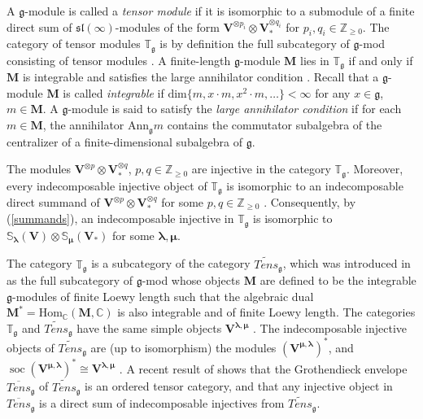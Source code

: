 \documentclass[12pt,oneside,english]{amsart}
\numberwithin{equation}{section}
\numberwithin{figure}{section}
\theoremstyle{plain}
\theoremstyle{plain}
\theoremstyle{remark}
\theoremstyle{definition}
\theoremstyle{plain}
\theoremstyle{remark}
\theoremstyle{definition}
\theoremstyle{plain}
\theoremstyle{plain}
\theoremstyle{definition}
\newcommand{\bV}{\mathbf{V}}
\newcommand{\bM}{\mathbf{M}}
\newcommand{\soc}{\operatorname{soc}}
\newcommand{\fg}{\mathfrak{g}}
\begin{document}
A $\fg$-module is called a {\em tensor module} if it is isomorphic to a submodule of a finite direct sum of $\mathfrak{sl}(\infty)$-modules of the form $\bV^{\otimes p_i}\otimes \bV_{*}^{\otimes q_i}$ for $p_i,q_i \in\mathbb{Z}_{\geq 0}$.
The category of tensor modules  $\mathbb{T}_{\mathfrak{g}}$  is by definition the full subcategory of $\mathfrak{g}$-mod consisting of tensor modules \cite{DPS}.
A finite-length $\mathfrak{g}$-module $\bM$ lies in  $\mathbb{T}_{\mathfrak{g}}$ if and only if $\bM$ is integrable and satisfies the large annihilator condition \cite{DPS}. Recall that a $\mathfrak{g}$-module $\bM$ is called  {\em integrable} if  $\mathrm{dim}\{m,x\cdot m,x^2\cdot m,\ldots \}<\infty$ for any $x\in\mathfrak{g}$, $m\in \bM$. A $\mathfrak{g}$-module is said to satisfy the {\em large annihilator condition} if for each $m\in \bM$, the annihilator $\mathrm{Ann}_{\mathfrak{g}}m$ contains the commutator subalgebra of the centralizer of a finite-dimensional subalgebra of $\mathfrak{g}$.

The modules $\bV^{\otimes p}\otimes \bV_{*}^{\otimes q}$, $p,q\in\mathbb{Z}_{\geq 0}$ are injective in the  category $\mathbb{T}_{\mathfrak{g}}$. Moreover, every indecomposable injective object of $\mathbb{T}_{\mathfrak{g}}$ is isomorphic to an indecomposable direct summand of  $\bV^{\otimes p}\otimes \bV_{*}^{\otimes q}$  for some $p,q\in\mathbb{Z}_{\geq 0}$  \cite{DPS}. Consequently, by (\ref{summands}), an indecomposable injective in $\mathbb T_{\fg}$ is isomorphic to
 $\mathbb{S}_{\boldsymbol{\lambda}}(\bV)\otimes \mathbb{S}_{\boldsymbol{\mu}}(\bV_*)$ for some $\boldsymbol{\lambda},\boldsymbol{\mu}$.

The category  $\mathbb{T}_{\mathfrak{g}}$ is a subcategory of the category $\widetilde{Tens}_{\mathfrak{g}}$, which was introduced in \cite{PS} as the full subcategory of $\mathfrak{g}$-mod whose  objects $\bM$ are defined to be the integrable $\mathfrak{g}$-modules of finite Loewy length such that the algebraic dual $\bM^*=\mathrm{Hom}_{\mathbb C}(\bM,\mathbb C)$ is also integrable and of finite Loewy length.
The  categories  $\mathbb{T}_{\mathfrak{g}}$ and  $\widetilde{Tens}_{\mathfrak{g}}$ have the same simple objects $\bV^{\boldsymbol{\lambda},{\boldsymbol{\mu}}}$ \cite{PS,DPS}. The indecomposable  injective objects of  $\widetilde{Tens}_{\mathfrak{g}}$ are (up to isomorphism) the modules $(\bV^{\boldsymbol{\mu},\boldsymbol{\lambda}})^*$, and $\soc (\bV^{\boldsymbol{\mu},\boldsymbol{\lambda}})^*\cong\bV^{\boldsymbol{\lambda},{\boldsymbol{\mu}}}$ \cite{PS}. A recent result of \cite{CP} shows that the Grothendieck envelope  $\overline{Tens}_{\mathfrak{g}}$ of  $\widetilde{Tens}_{\mathfrak{g}}$ is an ordered tensor category, and that any injective object in $\overline{Tens}_{\mathfrak{g}}$  is a direct sum of indecomposable injectives from $\widetilde{Tens}_{\mathfrak{g}}$.
\end{document}
